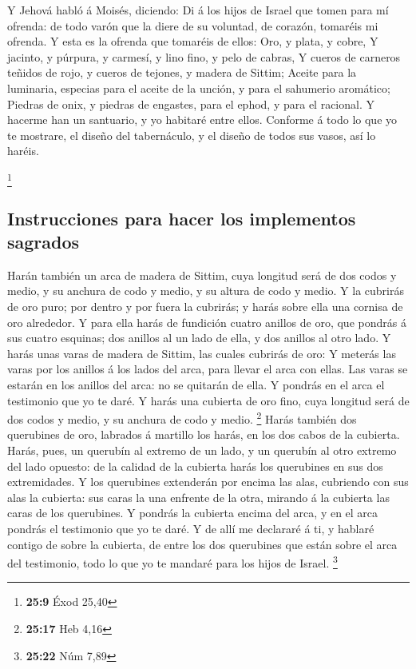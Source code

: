 Y Jehová habló á Moisés, diciendo:  Di á
los hijos de Israel que tomen para mí ofrenda: de todo varón que la
diere de su voluntad, de corazón, tomaréis mi ofrenda.  Y
esta es la ofrenda que tomaréis de ellos: Oro, y plata, y cobre,
 Y jacinto, y púrpura, y carmesí, y lino fino, y pelo de
cabras,  Y cueros de carneros teñidos de rojo, y cueros de
tejones, y madera de Sittim;  Aceite para la luminaria,
especias para el aceite de la unción, y para el sahumerio aromático;
 Piedras de onix, y piedras de engastes, para el ephod, y
para el racional.  Y hacerme han un santuario, y yo
habitaré entre ellos.  Conforme á todo lo que yo te
mostrare, el diseño del tabernáculo, y el diseño de todos sus vasos, así
lo haréis.

\footnote{\textbf{25:9} Éxod 25,40}

\hypertarget{instrucciones-para-hacer-los-implementos-sagrados}{%
\subsection{Instrucciones para hacer los implementos
sagrados}\label{instrucciones-para-hacer-los-implementos-sagrados}}

 Harán también un arca de madera de Sittim, cuya longitud
será de dos codos y medio, y su anchura de codo y medio, y su altura de
codo y medio.  Y la cubrirás de oro puro; por dentro y
por fuera la cubrirás; y harás sobre ella una cornisa de oro alrededor.
 Y para ella harás de fundición cuatro anillos de oro,
que pondrás á sus cuatro esquinas; dos anillos al un lado de ella, y dos
anillos al otro lado.  Y harás unas varas de madera de
Sittim, las cuales cubrirás de oro:  Y meterás las varas
por los anillos á los lados del arca, para llevar el arca con ellas.
 Las varas se estarán en los anillos del arca: no se
quitarán de ella.  Y pondrás en el arca el testimonio que
yo te daré.  Y harás una cubierta de oro fino, cuya
longitud será de dos codos y medio, y su anchura de codo y medio.
\footnote{\textbf{25:17} Heb 4,16}  Harás también dos
querubines de oro, labrados á martillo los harás, en los dos cabos de la
cubierta.  Harás, pues, un querubín al extremo de un
lado, y un querubín al otro extremo del lado opuesto: de la calidad de
la cubierta harás los querubines en sus dos extremidades.
 Y los querubines extenderán por encima las alas,
cubriendo con sus alas la cubierta: sus caras la una enfrente de la
otra, mirando á la cubierta las caras de los querubines. 
Y pondrás la cubierta encima del arca, y en el arca pondrás el
testimonio que yo te daré.  Y de allí me declararé á ti,
y hablaré contigo de sobre la cubierta, de entre los dos querubines que
están sobre el arca del testimonio, todo lo que yo te mandaré para los
hijos de Israel. \footnote{\textbf{25:22} Núm 7,89}

